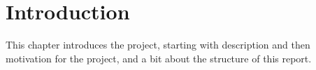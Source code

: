 \documentclass[11pt]{report}
\begin{document}
\begin{comment}
\chapter*{TODO-list for the report}
{\scriptsize
add chapter introductions and summaries
\paragraph{LightScript}
add language specification. add language design, perhaps more implemenation details
\paragraph{Yolan}
add design and implementation details, and semantic details in specification
\paragraph{Benchmarks}
add summary for each result section
\paragraph{Discussion}
MISSING
\paragraph{Conclusion}
MISSING
\paragraph{Bibliography}
MISSING
\paragraph{Benchmark source}
change to lstlisting
\paragraph{Yolan source}
ok for now, maybe add other class
\paragraph{LightScript source}
Needs more comments. Maybe add other classes
\paragraph{Index}
MISSING. Walk through when other parts are less drafty
}
\end{comment}
\chapter{Introduction}
This chapter introduces the project, starting with description and then motivation for the project, and a bit about the structure of this report.
\end{document}
